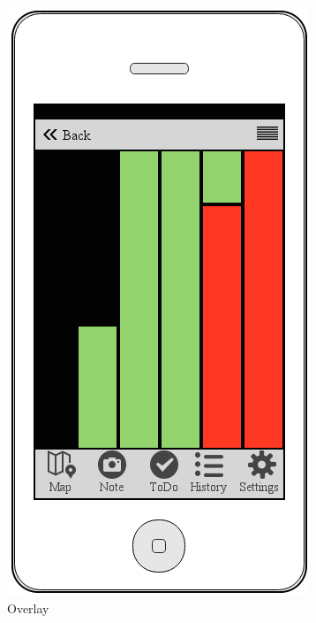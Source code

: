 \documentclass[12pt]{article}
\begin{document}
\begin{figure}[ht]
	\centering
	\includegraphics[width=\linewidth, height=0.4\textheight, keepaspectratio=true]{mockups/Overlay.png}
	\caption{Overlay}
	\endminipage\hfill
	\centering

\end{figure}
\end{document}
